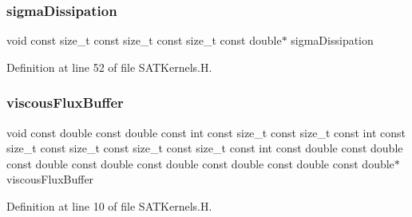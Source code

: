 \subsubsection{\texorpdfstring{sigma\+Dissipation}{sigmaDissipation}}
{\footnotesize\ttfamily void const size\+\_\+t const size\+\_\+t const size\+\_\+t const double$\ast$ sigma\+Dissipation}



Definition at line 52 of file S\+A\+T\+Kernels.\+H.

\hypertarget{SATKernels_8H_a106c22d96843fe9efa651233fc90cb72}{}\label{SATKernels_8H_a106c22d96843fe9efa651233fc90cb72} 
\subsubsection{\texorpdfstring{viscous\+Flux\+Buffer}{viscousFluxBuffer}}
{\footnotesize\ttfamily void const double const double const int const size\+\_\+t const size\+\_\+t const int const size\+\_\+t const size\+\_\+t const size\+\_\+t const size\+\_\+t const int const double const double const double const double const double const double const double const double$\ast$ viscous\+Flux\+Buffer}



Definition at line 10 of file S\+A\+T\+Kernels.\+H.

